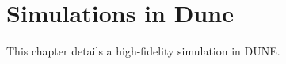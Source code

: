\chapter{Simulations in Dune}\label{cha:dune}
This chapter details a high-fidelity simulation in DUNE.